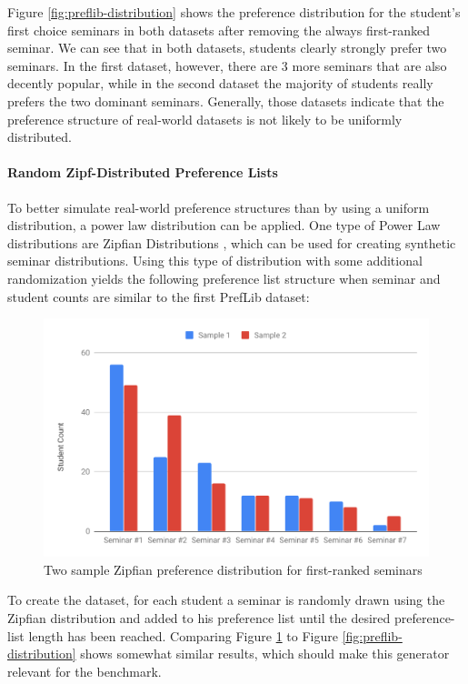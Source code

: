 Figure \ref{fig:preflib-distribution} shows the preference distribution for the student's first choice seminars in both datasets after removing the always first-ranked seminar. We can see that in both datasets, students clearly strongly prefer two seminars. In the first dataset, however, there are 3 more seminars that are also decently popular, while in the second dataset the majority of students really prefers the two dominant seminars. Generally, those datasets indicate that the preference structure of real-world datasets is not likely to be uniformly distributed.

\paragraph{Random Zipf-Distributed Preference Lists}
To better simulate real-world preference structures than by using a uniform distribution, a power law distribution can be applied. One type of Power Law distributions are Zipfian Distributions \cite{Zipf}, which can be used for creating synthetic seminar distributions. Using this type of distribution with some additional randomization yields the following preference list structure when seminar and student counts are similar to the first PrefLib dataset:

  \begin{figure}[h!]
    \centering
    \includegraphics[width=0.8\linewidth]{assets/plots/zipfian-distr.pdf}
    \caption{Two sample Zipfian preference distribution for first-ranked seminars}
    \label{fig:zipfian-distribution}
\end{figure}

To create the dataset, for each student a seminar is randomly drawn using the Zipfian distribution and added to his preference list until the desired preference-list length has been reached. Comparing Figure \ref{fig:zipfian-distribution} to Figure \ref{fig:preflib-distribution} shows somewhat similar results, which should make this generator relevant for the benchmark. 

